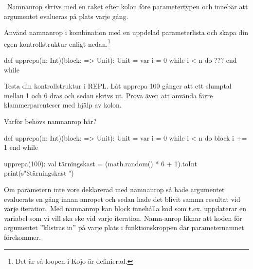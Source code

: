 \SOLUTION

\TaskSolved \what

\begin{ConceptConnections}
  
\end{ConceptConnections}

\QUESTEND




\label{func:upprepa}

\QUESTBEGIN

\Task  \what~Namnanrop skrivs med en raket efter kolon före parametertypen och innebär att argumentet evalueras på plats varje gång.

\Subtask Använd namnanrop i kombination med en uppdelad parameterlista och skapa din egen kontrollstruktur enligt nedan.\footnote{Det är så loopen  i Kojo är definierad.}
\begin{Code}
def upprepa(n: Int)(block: => Unit): Unit =
  var i = 0
  while i < n do 
    ???
  end while
\end{Code}

\Subtask
Testa din kontrollstruktur i REPL. Låt upprepa 100 gånger att ett slumptal mellan 1 och 6 dras och sedan skrivs ut. Prova även att använda färre klammerparenteser med hjälp av kolon.

\Subtask
Varför behövs namnanrop här?

\SOLUTION

\TaskSolved \what

\SubtaskSolved
\begin{Code}
def upprepa(n: Int)(block: => Unit): Unit =
  var i = 0
  while i < n do
    block
    i += 1
  end while
\end{Code}

\SubtaskSolved
\begin{Code}
upprepa(100):
  val tärningskast = (math.random() * 6 + 1).toInt
  print(s"\$tärningskast ")
\end{Code}

\SubtaskSolved Om parametern  inte vore deklarerad med namnanrop så hade argumentet evaluerats en gång innan anropet och sedan hade det blivit samma resultat vid varje iteration. Med namnanrop kan block innehålla kod som t.ex. uppdaterar en variabel som vi vill ska ske vid varje iteration. Namn-anrop liknar att koden för argumentet ''klistras in'' på varje plats i funktionskroppen där parameternamnet förekommer. 

